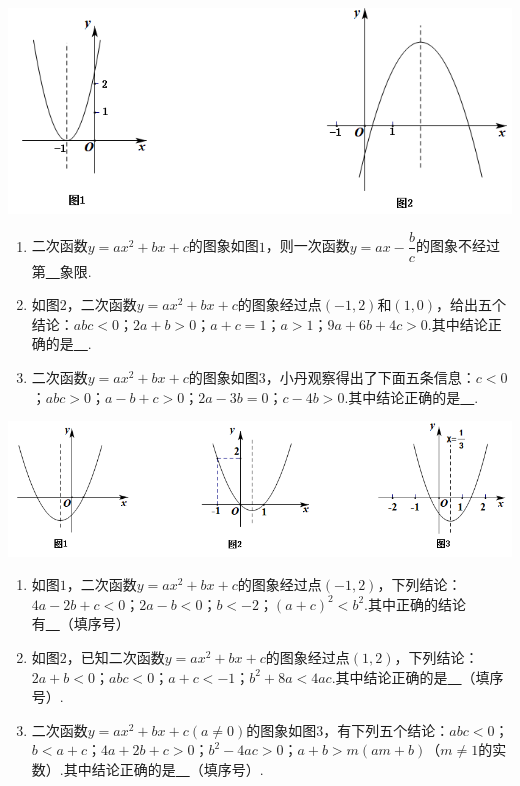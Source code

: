 \documentclass[10pt]{ctexart}
\begin{document}
\includegraphics[scale=0.6]{figure/l-9.PNG} 
\begin{dkyi}{}{}
  \begin{enumerate}[(1)]
  \item 二次函数$y=ax^2+bx+c$的图象如图$1$，则一次函数$y=ax-\dfrac{b}{c}$的图象不经过第\underline{~\hspace{1cm}~}象限.
  \item 如图$2$，二次函数$y=ax^2+bx+c$的图象经过点$(-1,2)$和$(1,0)$，给出五个结论：$abc<0$；$2a+b>0$；$a+c=1$；$a>1$；$9a+6b+4c>0$.其中结论正确的是\underline{~\hspace{1cm}~}.
  \item 二次函数$y=ax^2+bx+c$的图象如图$3$，小丹观察得出了下面五条信息：$c<0$；$abc>0$；$a-b+c>0$；$2a-3b=0$；$c-4b>0$.其中结论正确的是\underline{~\hspace{1cm}~}.
  \end{enumerate}
\end{dkyi}

\includegraphics[scale=0.6]{figure/l-10.PNG} 
\begin{jply}{}{}
    \begin{enumerate}[(1)]
  \item 如图$1$，二次函数$y=ax^2+bx+c$的图象经过点$(-1,2)$，下列结论：$4a-2b+c<0$；$2a-b<0$；$b<-2$；$(a+c)^2<b^2$.其中正确的结论有\underline{~\hspace{1cm}~}（填序号）
  \item 如图$2$，已知二次函数$y=ax^2+bx+c$的图象经过点$(1,2)$，下列结论：$2a+b<0$；$abc<0$；$a+c<-1$；$b^2+8a<4ac$.其中结论正确的是\underline{~\hspace{1cm}~}（填序号）.
  \item 二次函数$y=ax^2+bx+c(a\neq 0)$的图象如图$3$，有下列五个结论：$abc<0$；$b<a+c$；$4a+2b+c>0$；$b^2-4ac>0$；$a+b>m(am+b)$（$m\neq 1$的实数）.其中结论正确的是\underline{~\hspace{1cm}~}（填序号）.
  \end{enumerate}
\end{jply}
\end{document}
